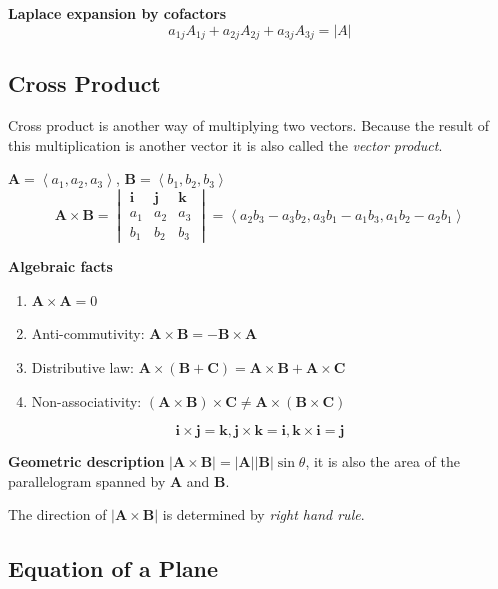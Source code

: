 \documentclass{article}
\newcommand\printvec[1]{\mathbf{#1}}
\newcommand\norm[1]{\mathbf{\left| \printvec{#1} \right|}}
\newcommand\lrangle[1]{\left \langle #1 \right \rangle}
\newcommand\deter[1]{\left| #1 \right|}
\begin{document}
\textbf{Laplace expansion by cofactors}
$$a_{1j}A_{1j} + a_{2j}A_{2j} + a_{3j}A_{3j} = \deter{A}$$

\subsection{Cross Product}

Cross product is another way of multiplying two vectors. Because the result of this multiplication is another
vector it is also called the \textit{vector product}.

$\mathbf{A} = \lrangle{a_1, a_2, a_3}$, $\mathbf{B} = \lrangle{b_1, b_2, b_3}$
\begin{equation*}
  \mathbf{A} \times \mathbf{B}
  = \begin{vmatrix}
    \mathbf{i} & \mathbf{j} & \mathbf{k} \\
    a_1        & a_2        & a_3        \\
    b_1        & b_2        & b_3
  \end{vmatrix}
  = \lrangle{a_2b_3 - a_3b_2, a_3b_1 - a_1b_3, a_1b_2 - a_2b_1}
\end{equation*}

\textbf{Algebraic facts}
\begin{enumerate}
  \item $\mathbf{A} \times \mathbf{A} = 0$
  \item Anti-commutivity: $\mathbf{A} \times \mathbf{B} = -\mathbf{B} \times \mathbf{A}$
  \item Distributive law: $\mathbf{A} \times (\mathbf{B}+\mathbf{C}) =  \mathbf{A} \times \mathbf{B} + \mathbf{A} \times \mathbf{C}$
  \item Non-associativity: $(\mathbf{A} \times \mathbf{B}) \times \mathbf{C} \neq \mathbf{A} \times (\mathbf{B} \times \mathbf{C})$
\end{enumerate}

$$\mathbf{i} \times \mathbf{j} = \mathbf{k}, \mathbf{j} \times \mathbf{k} = \mathbf{i}, \mathbf{k} \times \mathbf{i} = \mathbf{j}$$

\textbf{Geometric description}
$\deter{\mathbf{A} \times \mathbf{B}} = \norm{A}\norm{B}\sin\theta$, it is also the area of the parallelogram spanned by $\mathbf{A}$ and $\mathbf{B}$.

The direction of $\deter{\mathbf{A} \times \mathbf{B}}$ is determined by \textit{right hand rule}.

\subsection{Equation of a Plane}
\end{document}
